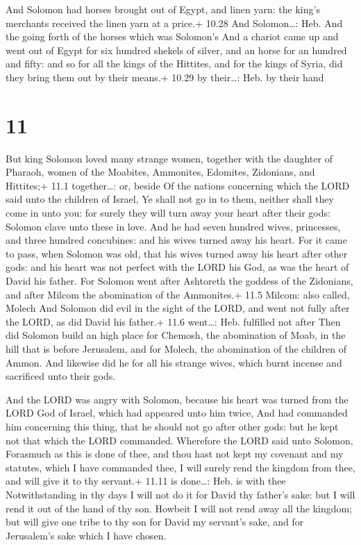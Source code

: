  And Solomon had horses brought out of Egypt, and linen
yarn: the king's merchants received the linen yarn at a price.+ 10.28
And Solomon\ldots: Heb. And the going forth of the horses which was
Solomon's  And a chariot came up and went out of Egypt for
six hundred shekels of silver, and an horse for an hundred and fifty:
and so for all the kings of the Hittites, and for the kings of Syria,
did they bring them out by their means.+ 10.29 by their\ldots: Heb. by
their hand

\hypertarget{section-10}{%
\section{11}\label{section-10}}

 But king Solomon loved many strange women, together with
the daughter of Pharaoh, women of the Moabites, Ammonites, Edomites,
Zidonians, and Hittites;+ 11.1 together\ldots: or, beside 
Of the nations concerning which the LORD said unto the children of
Israel, Ye shall not go in to them, neither shall they come in unto you:
for surely they will turn away your heart after their gods: Solomon
clave unto these in love.  And he had seven hundred wives,
princesses, and three hundred concubines: and his wives turned away his
heart.  For it came to pass, when Solomon was old, that his
wives turned away his heart after other gods: and his heart was not
perfect with the LORD his God, as was the heart of David his father.
 For Solomon went after Ashtoreth the goddess of the
Zidonians, and after Milcom the abomination of the Ammonites.+ 11.5
Milcom: also called, Molech  And Solomon did evil in the
sight of the LORD, and went not fully after the LORD, as did David his
father.+ 11.6 went\ldots: Heb. fulfilled not after  Then did
Solomon build an high place for Chemosh, the abomination of Moab, in the
hill that is before Jerusalem, and for Molech, the abomination of the
children of Ammon.  And likewise did he for all his strange
wives, which burnt incense and sacrificed unto their gods.

 And the LORD was angry with Solomon, because his heart
was turned from the LORD God of Israel, which had appeared unto him
twice,  And had commanded him concerning this thing, that
he should not go after other gods: but he kept not that which the LORD
commanded.  Wherefore the LORD said unto Solomon, Forasmuch
as this is done of thee, and thou hast not kept my covenant and my
statutes, which I have commanded thee, I will surely rend the kingdom
from thee, and will give it to thy servant.+ 11.11 is done\ldots: Heb.
is with thee  Notwithstanding in thy days I will not do it
for David thy father's sake: but I will rend it out of the hand of thy
son.  Howbeit I will not rend away all the kingdom; but
will give one tribe to thy son for David my servant's sake, and for
Jerusalem's sake which I have chosen.

